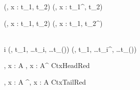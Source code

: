 
\Rule{\BinderReductionOne}
    {
    }
    {(\kappa, x : t_1, t_2) \betared {}(\kappa, x : t_1^\prime, t_2) }
    {}

\Rule{\BinderReductionTwo}
    {
    }
    {(\kappa, x : t_1, t_2) \betared {}(\kappa, x : t_1, t_2^\prime) }
    {}

\Rule{\NonbinderReduction}
    {
         \\
        i 
    }
    {(\kappa, t_1, \ldots t_i, \ldots t_{(\kappa)}) \betared {}(\kappa, t_1, \ldots t_i^\prime, \ldots t_{(\kappa)}) }
    {}


\Rule{\ContextReductionHeadRule}
    {
    }
    {\Gamma, x : A \betared \Gamma, x : A^\prime}
    {CtxHeadRed}

\Rule{\ContextReductionTailRule}
    {
    }
    {\Gamma, x : A \betared \Gamma^\prime, x : A}
    {CtxTailRed}
